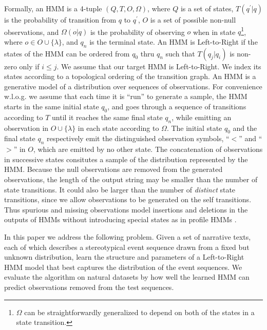\documentclass[letterpaper]{article}
\begin{document}
Formally, an HMM is a 4-tuple $(Q, T, O, \Omega)$, where $Q$ is a set of states, $T(q^\prime|q)$ is the probability of transition from $q$ to $q^\prime$, $O$ is a set of possible non-null observations, and $\Omega(o|q)$ is the probability of observing $o$ when in state $q$\footnote{$\Omega$ can be straightforwardly generalized to depend on both of the states in a state transition.},  where $o \in O \cup \{\lambda\}$, and $q_n$ is the terminal state. An HMM is Left-to-Right if the states of the HMM can be ordered from $q_0$ thru $q_n$ such that $T(q_j|q_i)$ is non-zero only if $i \leq j$. We assume that our target HMM is Left-to-Right. We index its states according to a topological ordering of the transition graph. An HMM is a generative model of a distribution over sequences of observations. For convenience w.l.o.g. we assume that each time it is ``run'' to generate a sample, the HMM starts in the same initial state $q_0$, and goes through a sequence of transitions according to $T$ until it reaches the same final state $q_n$, while emitting an observation in $O \cup \{\lambda\}$ in each state according to $\Omega$. The initial state $q_0$ and the final state $q_n$ respectively emit the distinguished observation symbols, ``$<$'' and ``$>$'' in $O$, which are emitted by no other state.
The concatenation of observations in successive states consitutes a sample of the distribution represented by the HMM. Because the null observations are removed from the generated observations, the length of the output string may be smaller than the number of state transitions. It could also be larger than the number of {\em distinct} state transitions, since we allow observations to be generated on the self transitions. Thus spurious and missing observations model insertions and deletions in the outputs of HMMs without introducing special states as in profile HMMs \cite{profileHMMs}. %



In this paper we address the following problem. Given a set of narrative texts, each of which describes a stereotypical event sequence drawn from a fixed but unknown distribution, learn the structure and parameters of a Left-to-Right HMM model that best captures the distribution of the event sequences. We evaluate the algorithm on natural datasets by how well the learned HMM can predict observations removed from the test sequences.  %
\end{document}
